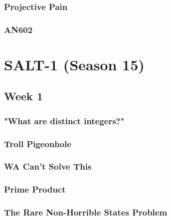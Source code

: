 \documentclass[titlepage=true]{scrartcl}
\begin{document}
	\subsubsection{Projective Pain}
	\label{14.2.6}
	
	\newpage

	\subsubsection{AN602}
	\label{14.2.7}
	
	\newpage

\section{SALT-1 (Season 15)}

    \subsection{Week 1}

    \subsubsection{"What are distinct integers?"}
	\label{15.1.1}
	
	\newpage

	\subsubsection{Troll Pigeonhole}
	\label{15.1.2}
	
	\newpage

    \subsubsection{WA Can't Solve This}
	\label{15.1.3}
	
	\newpage

    \subsubsection{Prime Product}
	\label{15.1.4}
	
	\newpage
	
	\subsubsection{The Rare Non-Horrible States Problem}
	\label{15.1.5}
	
	\newpage
\end{document}
